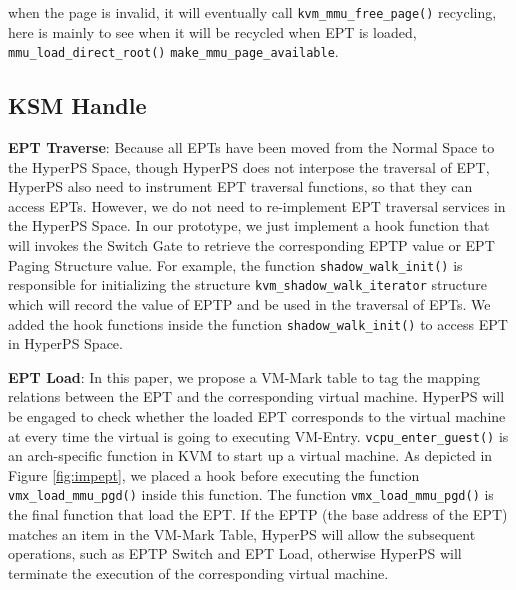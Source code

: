 when the page is invalid, it will eventually call \verb|kvm_mmu_free_page()| recycling, here is mainly to see when it will be recycled
when EPT is loaded, \verb|mmu_load_direct_root()| \verb|make_mmu_page_available|.
\fi

\iffalse

\subsection{KSM Handle}\label{ssub:ksm_handle}

\textbf{EPT Traverse}: 
Because all EPTs have been moved from the Normal Space to the HyperPS Space, though HyperPS does not interpose the traversal of EPT, HyperPS also need to instrument EPT traversal functions, so that they can access EPTs. 
However, we do not need to re-implement EPT traversal services in the HyperPS Space. In our prototype, we just implement a hook function that will invokes the Switch Gate to retrieve the corresponding EPTP value or EPT Paging Structure value. 
For example, the function \verb|shadow_walk_init()| is responsible for initializing the structure \verb|kvm_shadow_walk_iterator| structure which will record the value of EPTP and be used in the traversal of EPTs. We added the hook functions inside the function \verb|shadow_walk_init()| to access EPT in HyperPS Space. 

\textbf{EPT Load}: 
In this paper, we propose a VM-Mark table to tag the mapping relations between the EPT and the corresponding virtual machine. 
HyperPS will be engaged to check whether the loaded EPT corresponds to the virtual machine at every time the virtual is going to executing VM-Entry. 
\verb|vcpu_enter_guest()| is an arch-specific function in KVM to start up a virtual machine. 
As depicted in Figure \ref{fig:impept}, we placed a hook before executing the function \verb|vmx_load_mmu_pgd()| inside this function. The function \verb|vmx_load_mmu_pgd()| is the final function that load the EPT. 
If the EPTP (the base address of the EPT) matches an item in the VM-Mark Table, HyperPS will allow the subsequent operations, such as EPTP Switch and EPT Load, otherwise HyperPS will terminate the execution of the corresponding virtual machine. 

